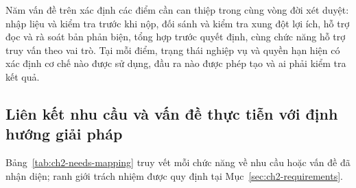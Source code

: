 Năm vấn đề trên xác định các điểm cần can thiệp trong cùng vòng đời xét duyệt: nhập liệu và kiểm tra trước khi nộp, đối sánh và kiểm tra xung đột lợi ích, hỗ trợ đọc và rà soát bản phản biện, tổng hợp trước quyết định, cùng chức năng hỗ trợ truy vấn theo vai trò. Tại mỗi điểm, trạng thái nghiệp vụ và quyền hạn hiện có xác định cơ chế nào được sử dụng, đầu ra nào được phép tạo và ai phải kiểm tra kết quả.

\subsection{Liên kết nhu cầu và vấn đề thực tiễn với định hướng giải pháp}

Bảng~\ref{tab:ch2-needs-mapping} truy vết mỗi chức năng về nhu cầu hoặc vấn đề đã nhận diện; ranh giới trách nhiệm được quy định tại Mục~\ref{sec:ch2-requirements}.

\begingroup
\setlength{\tabcolsep}{4pt}
\renewcommand{\arraystretch}{1.3}

